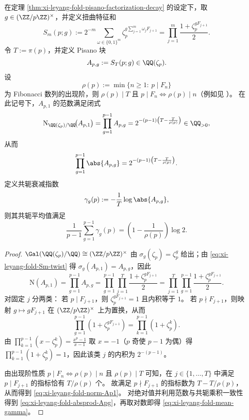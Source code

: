 \begin{proposition}\label{prop:xi-leyang-fold-cyclotomic-norm-conjugate-mean}
在定理 \ref{thm:xi-leyang-fold-pisano-factorization-decay} 的设定下，取 \(g\in(\ZZ/p\ZZ)^\times\)，并定义扭曲特征和
\begin{equation}\label{eq:xi-leyang-fold-Sm-twist}
S_m(p;g):=
2^{-m}\sum_{\omega\in\{0,1\}^m}\zeta_p^{g\sum_{j=1}^{m}\omega_jF_{j+1}}
=\prod_{j=1}^{m}\frac{1+\zeta_p^{gF_{j+1}}}{2}.
\end{equation}
令 \(T:=\pi(p)\)，并定义 Pisano 块
\[
A_{p,g}:=S_T(p;g)\in \QQ(\zeta_p).
\]
设
\[
\rho(p):=\min\{n\ge 1:\ p\mid F_n\}
\]
为 Fibonacci 数列的出现阶，则 \(\rho(p)\mid T\) 且 \(p\mid F_n\iff \rho(p)\mid n\)（例如见 \cite{Wall1960FibonacciModm}）。
在此记号下，\(A_{p,1}\) 的范数满足闭式
\begin{equation}\label{eq:xi-leyang-fold-norm-Ap1}
\mathrm N_{\QQ(\zeta_p)/\QQ}\!\bigl(A_{p,1}\bigr)
=\prod_{g=1}^{p-1}A_{p,g}
=2^{-(p-1)\left(T-\frac{T}{\rho(p)}\right)}\in\QQ_{>0},
\end{equation}
从而
\begin{equation}\label{eq:xi-leyang-fold-absprod-Apg}
\prod_{g=1}^{p-1}\abs{A_{p,g}}
=2^{-(p-1)\left(T-\frac{T}{\rho(p)}\right)}.
\end{equation}
定义共轭衰减指数
\[
\gamma_g(p):=-\frac{1}{T}\log\abs{A_{p,g}},
\]
则其共轭平均值满足
\begin{equation}\label{eq:xi-leyang-fold-mean-gamma}
\frac{1}{p-1}\sum_{g=1}^{p-1}\gamma_g(p)=\left(1-\frac{1}{\rho(p)}\right)\log 2.
\end{equation}
\end{proposition}
\begin{proof}
\(\Gal(\QQ(\zeta_p)/\QQ)\cong(\ZZ/p\ZZ)^\times\) 由 \(\sigma_g(\zeta_p)=\zeta_p^g\) 给出；由 \eqref{eq:xi-leyang-fold-Sm-twist} 得 \(\sigma_g(A_{p,1})=A_{p,g}\)，因此
\[
\mathrm N(A_{p,1})
=\prod_{g=1}^{p-1}A_{p,g}
=\prod_{g=1}^{p-1}\prod_{j=1}^{T}\frac{1+\zeta_p^{gF_{j+1}}}{2}
=\prod_{j=1}^{T}\prod_{g=1}^{p-1}\frac{1+\zeta_p^{gF_{j+1}}}{2}.
\]
对固定 \(j\) 分两类：
若 \(p\mid F_{j+1}\)，则 \(\zeta_p^{gF_{j+1}}=1\) 且内积等于 \(1\)。
若 \(p\nmid F_{j+1}\)，则映射 \(g\mapsto gF_{j+1}\) 在 \((\ZZ/p\ZZ)^\times\) 上为置换，从而
\[
\prod_{g=1}^{p-1}(1+\zeta_p^{gF_{j+1}})=\prod_{k=1}^{p-1}(1+\zeta_p^k).
\]
由 \(\prod_{k=1}^{p-1}(x-\zeta_p^k)=\frac{x^p-1}{x-1}\) 取 \(x=-1\)（\(p\) 奇使 \(p-1\) 为偶）得
\(\prod_{k=1}^{p-1}(1+\zeta_p^k)=1\)，因此该类 \(j\) 的内积为 \(2^{-(p-1)}\)。
\par
由出现阶性质 \(p\mid F_n\iff \rho(p)\mid n\) 且 \(\rho(p)\mid T\) 可知，在 \(j\in\{1,\dots,T\}\) 中满足 \(p\mid F_{j+1}\) 的指标恰有 \(T/\rho(p)\) 个。
故满足 \(p\nmid F_{j+1}\) 的指标数为 \(T-T/\rho(p)\)，从而得到 \eqref{eq:xi-leyang-fold-norm-Ap1}。
对绝对值并利用范数与共轭乘积一致性得到 \eqref{eq:xi-leyang-fold-absprod-Apg}，再取对数即得 \eqref{eq:xi-leyang-fold-mean-gamma}。
\end{proof}

